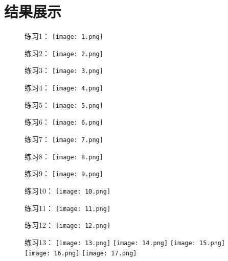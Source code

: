 \documentclass[UTF8]{article}
\begin{document}
\section{结果展示}
\begin{figure}[H]
    \centering
    练习1：
    \texttt{[image: 1.png]}
\end{figure}
\begin{figure}[H]
    \centering
    练习2：
    \texttt{[image: 2.png]}
\end{figure}
\begin{figure}[H]
    \centering
    练习3：
    \texttt{[image: 3.png]}
\end{figure}
\begin{figure}[H]
    \centering
    练习4：
    \texttt{[image: 4.png]}
\end{figure}
\begin{figure}[H]
    \centering
    练习5：
    \texttt{[image: 5.png]}
\end{figure}
\begin{figure}[H]
    \centering
    练习6：
    \texttt{[image: 6.png]}
\end{figure}
\begin{figure}[H]
    \centering
    练习7：
    \texttt{[image: 7.png]}
\end{figure}
\begin{figure}[H]
    \centering
    练习8：
    \texttt{[image: 8.png]} 
\end{figure}
\begin{figure}[H]
    \centering
    练习9：
    \texttt{[image: 9.png]}
\end{figure}
\begin{figure}[H]
    \centering
    练习10：
    \texttt{[image: 10.png]}
\end{figure}
\begin{figure}[H]
    \centering
    练习11：
    \texttt{[image: 11.png]}
\end{figure}
\begin{figure}[H]
    \centering
    练习12：
    \texttt{[image: 12.png]}
\end{figure}
\begin{figure}[H]
    \centering
    练习13：
    \texttt{[image: 13.png]}
    \texttt{[image: 14.png]}
    \texttt{[image: 15.png]}
    \texttt{[image: 16.png]}
    \texttt{[image: 17.png]}
\end{figure}
\end{document}
